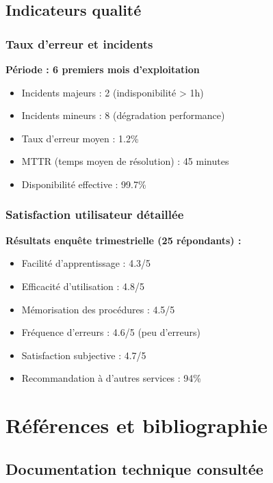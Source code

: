 \section{Indicateurs qualité}

\subsection{Taux d'erreur et incidents}

\textbf{Période : 6 premiers mois d'exploitation}
\begin{itemize}
    \item Incidents majeurs : 2 (indisponibilité > 1h)
    \item Incidents mineurs : 8 (dégradation performance)
    \item Taux d'erreur moyen : 1.2\%
    \item MTTR (temps moyen de résolution) : 45 minutes
    \item Disponibilité effective : 99.7\%
\end{itemize}

\subsection{Satisfaction utilisateur détaillée}

\textbf{Résultats enquête trimestrielle (25 répondants) :}
\begin{itemize}
    \item Facilité d'apprentissage : 4.3/5
    \item Efficacité d'utilisation : 4.8/5
    \item Mémorisation des procédures : 4.5/5
    \item Fréquence d'erreurs : 4.6/5 (peu d'erreurs)
    \item Satisfaction subjective : 4.7/5
    \item Recommandation à d'autres services : 94\%
\end{itemize}

\chapter{Références et bibliographie}
\label{app:references}

\section{Documentation technique consultée}

